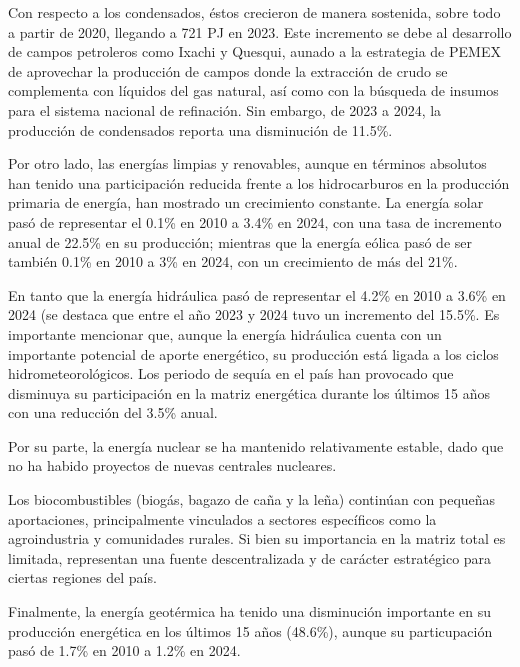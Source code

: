 \documentclass{sener2025}
\begin{document}
Con respecto a los condensados, éstos crecieron de manera sostenida, sobre todo a partir de 2020, llegando a 721 PJ en 2023. Este incremento se debe al desarrollo de campos petroleros como Ixachi y Quesqui, aunado a la estrategia de PEMEX de aprovechar la producción de campos donde la extracción de crudo se complementa con líquidos del gas natural, así como con la búsqueda de insumos para el sistema nacional de refinación. Sin embargo, de 2023 a 2024, la producción de condensados reporta una disminución de 11.5\%.

Por otro lado, las energías limpias y renovables, aunque en términos absolutos han tenido una participación reducida frente a los hidrocarburos en la producción primaria de energía, han mostrado un crecimiento constante. La energía solar pasó de representar el 0.1\% en 2010 a 3.4\% en 2024, con una tasa de incremento anual de 22.5\% en su producción; mientras que la energía eólica pasó de ser también 0.1\% en 2010 a 3\% en 2024, con un crecimiento de más del 21\%.

En tanto que la energía hidráulica pasó de representar el 4.2\% en 2010 a 3.6\% en 2024 (se destaca que entre el año 2023 y 2024 tuvo un incremento del 15.5\%. Es importante mencionar que, aunque la energía hidráulica cuenta con un importante potencial de aporte energético, su producción está ligada a los ciclos hidrometeorológicos. Los periodo de sequía en el país han provocado que disminuya su participación en la matriz energética durante los últimos 15 años con una reducción del 3.5\% anual.

Por su parte, la energía nuclear se ha mantenido relativamente estable, dado que no ha habido proyectos de nuevas centrales nucleares.

Los biocombustibles (biogás, bagazo de caña y la leña) continúan con pequeñas aportaciones, principalmente vinculados a sectores específicos como la agroindustria y comunidades rurales. Si bien su importancia en la matriz total es limitada, representan una fuente descentralizada y de carácter estratégico para ciertas regiones del país.

Finalmente, la energía geotérmica ha tenido una disminución importante en su producción energética en los últimos 15 años (48.6\%), aunque su particupación pasó de 1.7\% en 2010 a 1.2\% en 2024.
\end{document}
